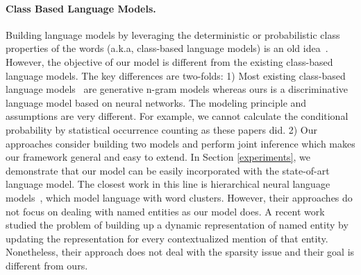 \documentclass[11pt,a4paper]{article}
\begin{document}
\paragraph{\bf Class Based Language Models.}
Building language models by leveraging the deterministic or probabilistic class properties of the words (a.k.a, class-based language models) is an old idea~\cite{brown1992, goodman}. However, the objective of our model is different from the existing class-based language models. 
The key differences are two-folds:
1) 
Most existing class-based language models~\cite{brown1992, pereira1993, niesler1998, baker1998, goodman, maltese2001} are generative n-gram models whereas ours is a discriminative language model based on neural networks. The modeling principle and assumptions are very different. For example, we cannot calculate the conditional probability by statistical occurrence counting as these papers did. 2) Our approaches consider building two models and perform joint inference which makes our framework general and easy to extend. In Section \ref{experiments}, we demonstrate that our model can be easily incorporated with the state-of-art language model.  
The closest work in this line is hierarchical neural language models~\cite{hierarchical}, which model language with word clusters. However, their approaches do not focus on dealing with named entities as our model does. 
A recent work~\cite{dynamic_entity} studied the problem of building up a dynamic representation of named entity by updating the representation for every contextualized mention of that entity.  Nonetheless, their approach does not deal with the sparsity issue and their goal is different from ours.
\end{document}
